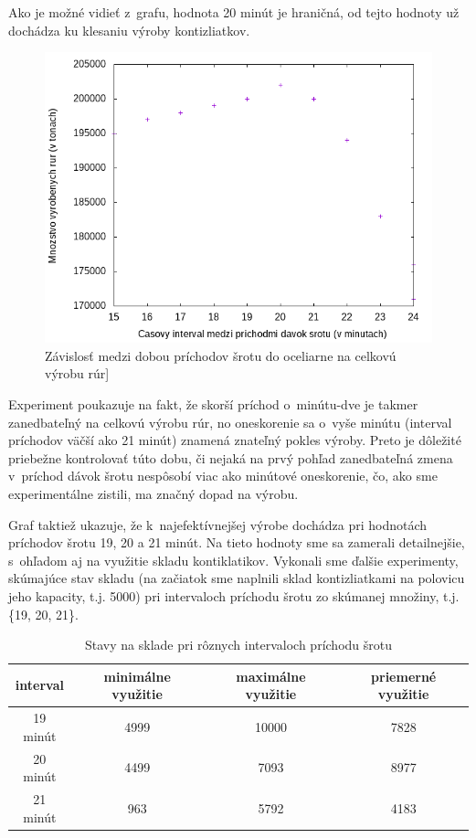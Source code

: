 \documentclass[]{article}
\begin{document}
Ako je možné vidieť z~grafu, hodnota 20 minút je hraničná, od tejto hodnoty už dochádza ku klesaniu výroby kontizliatkov.

\begin{figure}[h!]
	\includegraphics[width=\textwidth]{prichody_srotu_rury.png}
	\caption{Závislosť medzi dobou príchodov šrotu do oceliarne na celkovú výrobu rúr]}
\end{figure}

Experiment poukazuje na fakt, že skorší príchod o~minútu-dve je takmer zanedbateľný na celkovú výrobu rúr, no oneskorenie sa o~vyše minútu (interval príchodov väčší ako 21 minút) znamená znateľný pokles výroby. Preto je dôležité priebežne kontrolovať túto dobu, či nejaká na prvý pohľad zanedbateľná zmena v~príchod dávok šrotu nespôsobí viac ako minútové oneskorenie, čo, ako sme experimentálne zistili, ma značný dopad na výrobu.

Graf taktiež ukazuje, že k~najefektívnejšej výrobe dochádza pri hodnotách príchodov šrotu 19, 20 a 21 minút. Na tieto hodnoty sme sa zamerali detailnejšie, s~ohľadom aj na využitie skladu kontiklatikov. Vykonali sme ďalšie experimenty, skúmajúce stav skladu (na začiatok sme naplnili sklad kontizliatkami na polovicu jeho kapacity, t.j. 5000) pri intervaloch príchodu šrotu zo skúmanej množiny, t.j. \{19, 20, 21\}.

\begin{center}
	\begin{table}[!h]
		\centering
		\begin{tabular}{|c|c|c|c|} 
			\hline
			interval & minimálne využitie & maximálne využitie & priemerné využitie\\
			\hline
			\hline
			19 minút & 4999 & 10000 & 7828 \\
			\hline
			20 minút & 4499 & 7093 & 8977 \\
			\hline
			21 minút & 963 & 5792 & 4183 \\
			\hline
		\end{tabular}
		\caption{Stavy na sklade pri rôznych intervaloch príchodu šrotu}
	\end{table}
\end{center}
\end{document}
